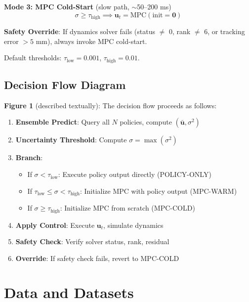 \documentclass[conference]{IEEEtran}
\begin{document}
\textbf{Mode 3: MPC Cold-Start} (slow path, $\sim$50--200 ms)
\begin{equation}
\sigma \geq \tau_{\text{high}} \implies \mathbf{u}_t = \text{MPC}(\text{init}=\mathbf{0})
\end{equation}

\textbf{Safety Override}: If dynamics solver fails (status $\neq$ 0, rank $\neq$ 6, or tracking error $> 5$ mm), always invoke MPC cold-start.

Default thresholds: $\tau_{\text{low}} = 0.001$, $\tau_{\text{high}} = 0.01$.

\subsection{Decision Flow Diagram}

\textbf{Figure 1} (described textually): The decision flow proceeds as follows:

\begin{enumerate}
\item \textbf{Ensemble Predict}: Query all $N$ policies, compute $(\bar{\mathbf{u}}, \sigma^2)$
\item \textbf{Uncertainty Threshold}: Compute $\sigma = \max(\sigma^2)$
\item \textbf{Branch}:
\begin{itemize}
\item If $\sigma < \tau_{\text{low}}$: Execute policy output directly (POLICY-ONLY)
\item If $\tau_{\text{low}} \leq \sigma < \tau_{\text{high}}$: Initialize MPC with policy output (MPC-WARM)
\item If $\sigma \geq \tau_{\text{high}}$: Initialize MPC from scratch (MPC-COLD)
\end{itemize}
\item \textbf{Apply Control}: Execute $\mathbf{u}_t$, simulate dynamics
\item \textbf{Safety Check}: Verify solver status, rank, residual
\item \textbf{Override}: If safety check fails, revert to MPC-COLD
\end{enumerate}

\section{Data and Datasets}
\end{document}
